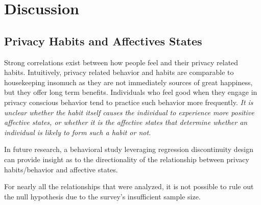 \documentclass[acmtog]{acmart}
\begin{document}
\section{Discussion}
\subsection{Privacy Habits and Affectives States}
Strong correlations exist between how people feel and their privacy related
habits. Intuitively, privacy related behavior and habits are comparable to
housekeeping insomuch as they are not immediately sources of great happiness,
but they offer long term benefits. Individuals who feel good when they engage in
privacy conscious behavior tend to practice such behavior more frequently.
\emph{It is unclear whether the habit itself causes the individual to experience
more positive affective states, or whether it is the affective states that
determine whether an individual is likely to form such a habit or not.}

In future research, a behavioral study leveraging regression discontinuity
design can provide insight as to the directionality of the relationship between
privacy habits/behavior and affective states.

For nearly all the relationships that were analyzed, it is not possible to rule
out the null hypothesis due to the survey's insufficient sample size.





\appendix
\end{document}
